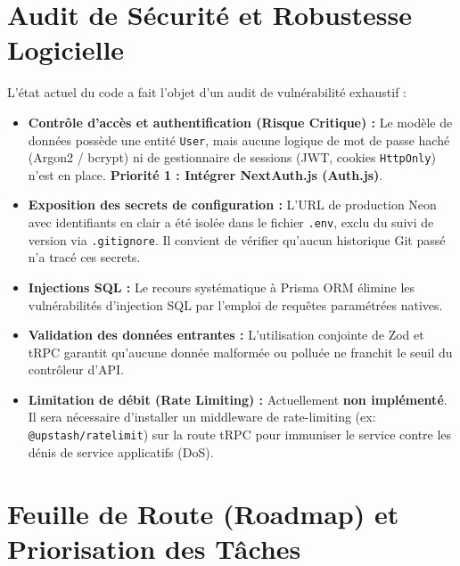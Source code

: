 \documentclass[11pt,a4paper]{article}
\begin{document}
\section{Audit de Sécurité et Robustesse Logicielle}

L'état actuel du code a fait l'objet d'un audit de vulnérabilité exhaustif :

\begin{itemize}
    \item \textbf{Contrôle d'accès et authentification (Risque Critique) :} 
    Le modèle de données possède une entité \texttt{User}, mais aucune logique de mot de passe haché (Argon2 / bcrypt) ni de gestionnaire de sessions (JWT, cookies \texttt{HttpOnly}) n'est en place. \textbf{Priorité 1 : Intégrer NextAuth.js (Auth.js)}.
    \item \textbf{Exposition des secrets de configuration :} 
    L'URL de production Neon avec identifiants en clair a été isolée dans le fichier \texttt{.env}, exclu du suivi de version via \texttt{.gitignore}. Il convient de vérifier qu'aucun historique Git passé n'a tracé ces secrets.
    \item \textbf{Injections SQL :} 
    Le recours systématique à Prisma ORM élimine les vulnérabilités d'injection SQL par l'emploi de requêtes paramétrées natives.
    \item \textbf{Validation des données entrantes :} 
    L'utilisation conjointe de Zod et tRPC garantit qu'aucune donnée malformée ou polluée ne franchit le seuil du contrôleur d'API.
    \item \textbf{Limitation de débit (Rate Limiting) :} 
    Actuellement \textbf{non implémenté}. Il sera nécessaire d'installer un middleware de rate-limiting (ex: \texttt{@upstash/ratelimit}) sur la route tRPC pour immuniser le service contre les dénis de service applicatifs (DoS).
\end{itemize}

\section{Feuille de Route (Roadmap) et Priorisation des Tâches}
\end{document}
